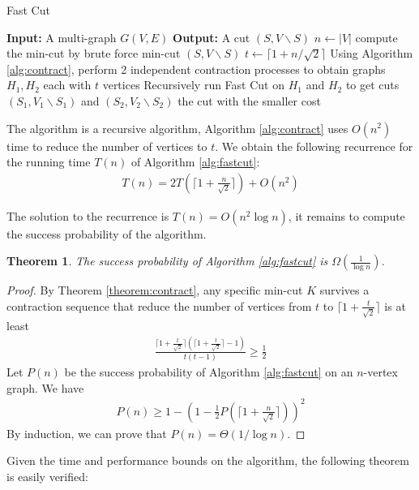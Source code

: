 \documentclass[12pt]{article}
\theoremstyle{plain}
\newtheorem{theorem}{Theorem}[section]
\begin{document}
\begin{algorithm}
\caption{Fast Cut}
\label{alg:fastcut}
\begin{algorithmic}
    \STATE \textbf{Input:} A multi-graph $G(V,E)$
    \STATE \textbf{Output:} A cut $(S,V\backslash S)$
    \STATE $n\leftarrow |V|$
    \STATE compute the min-cut by brute force
    \RETURN min-cut $(S,V\backslash S)$
    \ELSE
    \STATE $t\leftarrow \lceil 1+n/\sqrt{2}\rceil$
    \STATE Using Algorithm \ref{alg:contract}, perform 2 independent contraction processes to obtain graphs $H_1,H_2$ each with $t$ vertices
    \STATE Recursively run Fast Cut on $H_1$ and $H_2$ to get cuts $(S_1,V_1\backslash S_1)$ and $(S_2,V_2\backslash S_2)$
    \RETURN the cut with the smaller cost
    \ENDIF
\end{algorithmic}
\end{algorithm}

The algorithm is a recursive algorithm, Algorithm \ref{alg:contract} uses $O(n^2)$ time to reduce the number of vertices to $t$. We obtain the following recurrence for the running time $T(n)$ of Algorithm \ref{alg:fastcut}:
\begin{align*}
    T(n)=2T\left(\lceil 1+\frac{n}{\sqrt{2}}\rceil\right)+O(n^2)
\end{align*}

The solution to the recurrence is $T(n)=O(n^2\log n)$, it remains to compute the success probability of the algorithm. 

\begin{theorem}
    The success probability of Algorithm \ref{alg:fastcut} is $\Omega(\frac{1}{\log n})$.
\end{theorem}
\begin{proof}
    By Theorem \ref{theorem:contract}, any specific min-cut $K$ survives a contraction sequence that reduce the number of vertices from $t$ to $\lceil 1+\frac{t}{\sqrt{2}}\rceil$ is at least
    \begin{align*}
        \frac{\lceil 1+\frac{t}{\sqrt{2}}\rceil(\lceil 1+\frac{t}{\sqrt{2}}\rceil-1)}{t(t-1)}\geq \frac{1}{2}
    \end{align*}
    Let $P(n)$ be the success probability of Algorithm \ref{alg:fastcut} on an $n$-vertex graph. We have
    \begin{align*}
        P(n)\geq 1-\left(1-\frac{1}{2}P\left(\lceil 1+\frac{n}{\sqrt{2}}\rceil\right)\right)^2
    \end{align*}
    By induction, we can prove that $P(n)=\Theta(1/\log n)$.
\end{proof}
Given the time and performance bounds on the algorithm, the following theorem is easily verified:
\end{document}
